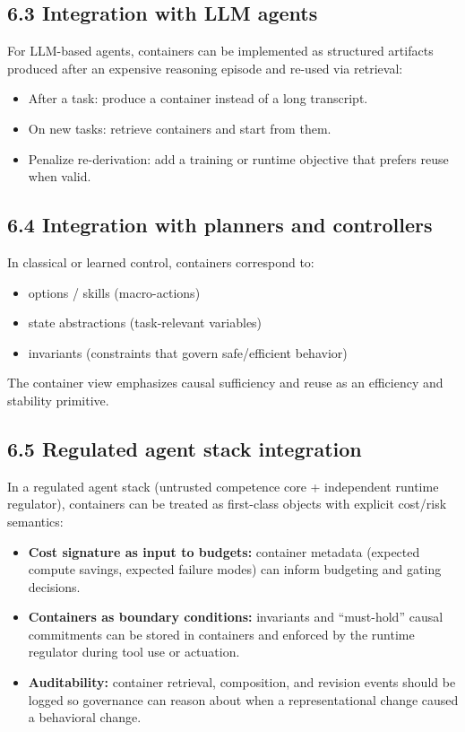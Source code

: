 \documentclass[11pt]{article}
\begin{document}
\subsection*{6.3 Integration with LLM agents}
For LLM-based agents, containers can be implemented as structured artifacts produced after an expensive reasoning episode and re-used via retrieval:

\begin{itemize}
\item After a task: produce a container instead of a long transcript.
\item On new tasks: retrieve containers and start from them.
\item Penalize re-derivation: add a training or runtime objective that prefers reuse when valid.
\end{itemize}

\subsection*{6.4 Integration with planners and controllers}
In classical or learned control, containers correspond to:

\begin{itemize}
\item options / skills (macro-actions)
\item state abstractions (task-relevant variables)
\item invariants (constraints that govern safe/efficient behavior)
\end{itemize}

The container view emphasizes causal sufficiency and reuse as an efficiency and stability primitive.

\subsection*{6.5 Regulated agent stack integration}
In a regulated agent stack (untrusted competence core + independent runtime regulator), containers can be treated as first-class objects with explicit cost/risk semantics:
\begin{itemize}
\item \textbf{Cost signature as input to budgets:} container metadata (expected compute savings, expected failure modes) can inform budgeting and gating decisions.
\item \textbf{Containers as boundary conditions:} invariants and ``must-hold'' causal commitments can be stored in containers and enforced by the runtime regulator during tool use or actuation.
\item \textbf{Auditability:} container retrieval, composition, and revision events should be logged so governance can reason about when a representational change caused a behavioral change.
\end{itemize}
\end{document}
